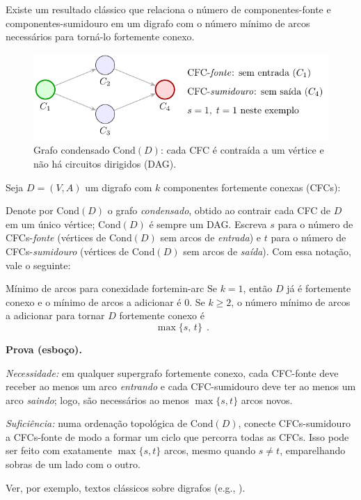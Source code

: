 Existe um resultado clássico que relaciona o número de componentes-fonte e componentes-sumidouro em um digrafo com o número mínimo de arcos necessários para torná-lo fortemente conexo.


\begin{figure}[H]
	\centering
	\includegraphics[width=0.9\linewidth]{figures/fig_condensado_st.pdf}

	\caption{Grafo condensado $\mathrm{Cond}(D)$: cada CFC é contraída a um vértice e não há circuitos dirigidos (DAG).}
	\label{fig:condensado-st}
\end{figure}



Seja $D=(V,A)$ um digrafo com $k$ componentes fortemente conexas (CFCs):


Denote por $\mathrm{Cond}(D)$ o grafo \emph{condensado}, obtido ao contrair cada CFC de $D$ em um único vértice; $\mathrm{Cond}(D)$ é sempre um DAG. Escreva $s$ para o número de CFCs-\emph{fonte} (vértices de $\mathrm{Cond}(D)$ sem arcos de \emph{entrada}) e $t$ para o número de CFCs-\emph{sumidouro} (vértices de $\mathrm{Cond}(D)$ sem arcos de \emph{saída}). Com essa notação, vale o seguinte:


\begin{lemabox}{Mínimo de arcos para conexidade forte}{min-arc}
	Se $k=1$, então $D$ já é fortemente conexo e o mínimo de arcos a adicionar é $0$. Se $k\ge 2$, o número mínimo de arcos a adicionar para tornar $D$ fortemente conexo é \[\boxed{\;\max\{s,\,t\}\;}\,.\]


	\textbf{Prova (esboço).}

	\emph{Necessidade:} em qualquer supergrafo fortemente conexo, cada CFC-fonte deve receber ao menos um arco \emph{entrando} e cada CFC-sumidouro deve ter ao menos um arco \emph{saindo}; logo, são necessários ao menos $\max\{s,t\}$ arcos novos.


	\emph{Suficiência:} numa ordenação topológica de $\mathrm{Cond}(D)$, conecte CFCs-sumidouro a CFCs-fonte de modo a formar um ciclo que percorra todas as CFCs. Isso pode ser feito com exatamente $\max\{s,t\}$ arcos, mesmo quando $s\ne t$, emparelhando sobras de um lado com o outro.


	Ver, por exemplo, textos clássicos sobre digrafos (e.g., \cite{schrijver2003comb}).
\end{lemabox}


